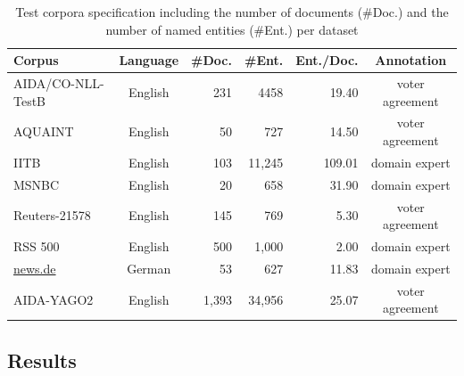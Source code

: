 \begin{table}[tb!]
\centering
\caption{Test corpora specification including the number of documents (\#Doc.) and the number of named entities (\#Ent.) per dataset}
\label{tab:data}
\begin{tabular}{lcrrrc}
\toprule
\textbf{Corpus} & \textbf{Language} & \textbf{\#Doc.} & \textbf{\#Ent.} & \textbf{Ent./Doc.} & \textbf{Annotation}\\
\midrule
AIDA/CO-NLL-TestB  & English & 231 & 4458 &19.40& voter agreement\\
AQUAINT & English & 50 & 727 & 14.50 &voter agreement\\
IITB & English & 103 & 11,245 & 109.01 &domain expert\\
MSNBC & English & 20 & 658 &31.90 &domain expert\\
Reuters-21578  & English & 145 & 769 &5.30 &voter agreement\\
RSS 500 & English & 500 & 1,000 & 2.00&domain expert \\
\url{news.de} & German & 53 & 627 & 11.83 &domain expert\\
AIDA-YAGO2 & English & 1,393 & 34,956 &25.07 &voter agreement\\
\bottomrule
\end{tabular}
\end{table}



\subsection{Results}
\label{results}

